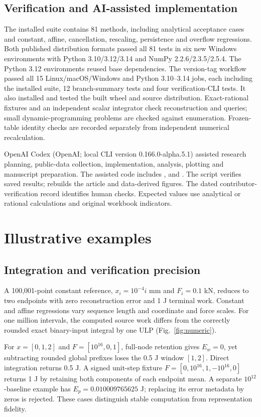 \documentclass[preprint,12pt,a4paper]{elsarticle}
\begin{document}
\subsection{Verification and AI-assisted implementation}
The installed suite contains 81 methods, including analytical acceptance cases and constant, affine, cancellation, rescaling, persistence and overflow regressions. Both published distribution formats passed all 81 tests in six new Windows environments with Python 3.10/3.12/3.14 and NumPy 2.2.6/2.3.5/2.5.4. The Python 3.12 environments reused base dependencies. The version-tag workflow passed all 15 Linux/macOS/Windows and Python 3.10--3.14 jobs, each including the installed suite, 12 branch-summary tests and four verification-CLI tests. It also installed and tested the built wheel and source distribution. Exact-rational fixtures and an independent scalar integrator check reconstruction and queries; small dynamic-programming problems are checked against enumeration. Frozen-table identity checks are recorded separately from independent numerical recalculation.

OpenAI Codex (OpenAI; local CLI version 0.166.0-alpha.5.1) assisted research planning, public-data collection, implementation, analysis, plotting and manuscript preparation. The assisted code includes ,  and . The script  verifies saved results;  rebuilds the article and data-derived figures. The dated contributor-verification record identifies human checks. Expected values use analytical or rational calculations and original workbook indicators.

\section{Illustrative examples}
\subsection{Integration and verification precision}
A 100,001-point constant reference, $x_i=10^{-4}i$ mm and $F_i=0.1$ kN, reduces to two endpoints with zero reconstruction error and 1 J terminal work. Constant and affine regressions vary sequence length and coordinate and force scales. For one million intervals, the computed source work differs from the correctly rounded exact binary-input integral by one ULP (Fig.~\ref{fig:numeric}).

For $x=[0,1,2]$ and $F=[10^{16},0,1]$, full-node retention gives $E_w=0$, yet subtracting rounded global prefixes loses the 0.5 J window $[1,2]$. Direct integration returns 0.5 J. A signed unit-step fixture $F=[0,10^{16},1,-10^{16},0]$ returns 1 J by retaining both components of each endpoint mean. A separate $10^{12}$-baseline example has $E_p=0.010009765625$ J; replacing its error metadata by zeros is rejected. These cases distinguish stable computation from representation fidelity.
\end{document}
